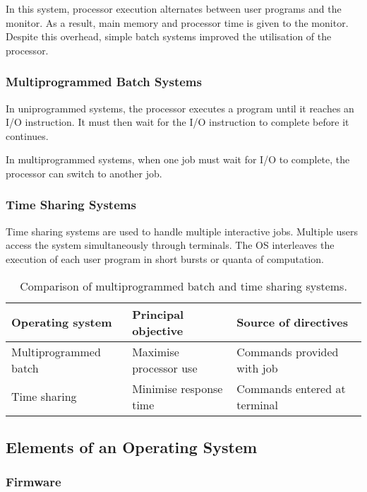 In this system, processor execution alternates between user programs and the monitor.
As a result, main memory and processor time is given to the monitor.
Despite this overhead, simple batch systems improved the utilisation of the processor.

\subsubsection{Multiprogrammed Batch Systems}

In uniprogrammed systems, the processor executes a program until it reaches an I/O instruction.
It must then wait for the I/O instruction to complete before it continues.

In multiprogrammed systems, when one job must wait for I/O to complete, the processor can switch to another job.

\subsubsection{Time Sharing Systems}

Time sharing systems are used to handle multiple interactive jobs.
Multiple users access the system simultaneously through terminals.
The OS interleaves the execution of each user program in short bursts or quanta of computation.

\begin{table}[htp]
  \centering
  \caption*{Comparison of multiprogrammed batch and time sharing systems.}
  \begin{tabular}{lll}
    \toprule
    Operating system & Principal objective & Source of directives \\
    \midrule
    Multiprogrammed batch & Maximise processor use & Commands provided with job \\
    Time sharing & Minimise response time & Commands entered at terminal \\
    \bottomrule
  \end{tabular}
\end{table}

\subsection{Elements of an Operating System}

\subsubsection{Firmware}

